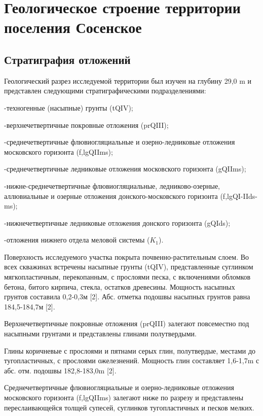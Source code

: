 \chapter{Геологическое строение территории поселения Сосенское}\label{ch:ch2}

\section{Стратиграфия отложений}\label{sec:ch2/sec1}

Геологический разрез исследуемой территории был изучен на глубину 29,0 \si{\meter} и представлен следующими стратиграфическими подразделениями:

-техногенные (насыпные) грунты (tQIV);

-верхнечетвертичные покровные отложения (prQIII);

-среднечетвертичные флювиогляциальные и озерно-ледниковые отложения московского горизонта (f,lgQIIms);

-среднечетвертичные ледниковые отложения московского горизонта (gQIIms);

-нижне-среднечетвертичные флювиогляциальные, ледниково-озерные, аллювиальные и озерные отложения донского-московского горизонта (f,lgQI-IIds-ms);

-нижнечетвертичные ледниковые отложения донского горизонта (gQIds);

-отложения нижнего отдела меловой системы ($K_1$).

Поверхность исследуемого участка покрыта почвенно-растительным слоем. Во всех скважинах встречены насыпные грунты (tQIV), представленные суглинком мягкопластичным, перекопанным, с прослоями песка, с включениями обломков бетона, битого кирпича, стекла, остатков древесины. Мощность насыпных грунтов составила 0,2-0,3м [2]. Абс. отметка подошвы насыпных грунтов равна 184,5-184,7м [2].

Верхнечетвертичные покровные отложения (prQIII) залегают повсеместно под насыпными грунтами и представлены глинами полутвердыми.

Глины коричневые с прослоями и пятнами серых глин, полутвердые, местами до тугопластичных, с прослоями ожелезнений. Мощность глин составляет 1,6-1,7\si{\meter} с абс. отм. подошвы 182,8-183,0\si{\meter} [2].

Среднечетвертичные флювиогляциальные и озерно-ледниковые отложения московского горизонта (f,lgQIIms) залегают ниже по разрезу и представлены переслаивающейся толщей супесей, суглинков тугопластичных и песков мелких.

